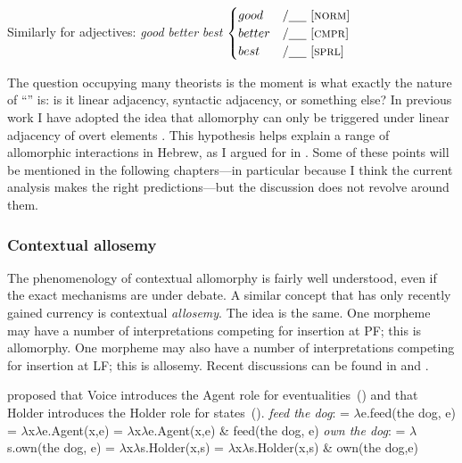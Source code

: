 Similarly for adjectives:
\pex
	\a \emph{good}		
	\a \emph{better}
	\a \emph{best}
\xe
\ex {} \lra $\begin{cases}
	good & / \trace~ \text{[\gsc{NORM}]} \\
	better & / \trace ~ \text{[\gsc{CMPR}]} \\
	best & / \trace ~ \text{[\gsc{SPRL}]} \\
	\end{cases}$
\xe

The question occupying many theorists is the moment is what exactly the nature of ``\trace'' is: is it linear adjacency, syntactic adjacency, or something else? In previous work I have adopted the idea that allomorphy can only be triggered under linear adjacency of overt elements \citep{embick10,marantz13}. This hypothesis helps explain a range of allomorphic interactions in Hebrew, as I argued for in \cite{kastner18nllt}. Some of these points will be mentioned in the following chapters---in particular because I think the current analysis makes the right predictions---but the discussion does not revolve around them.

		\subsubsection{Contextual allosemy}
The phenomenology of contextual allomorphy is fairly well understood, even if the exact mechanisms are under debate. A similar concept that has only recently gained currency is contextual \emph{allosemy}. The idea is the same. One morpheme may have a number of interpretations competing for insertion at PF; this is allomorphy. One morpheme may also have a number of interpretations competing for insertion at LF; this is allosemy. Recent discussions can be found in \cite{woodmarantz17} and \cite{mylermarantz19cup}.

\cite{kratzer96} proposed that Voice introduces the Agent role for eventualities~(\nextx) and that Holder introduces the Holder role for states~(\anextx).
\pex \emph{feed the dog}:
	\a {} = $\lambda$e.feed(the dog, e)
	\a {} = $\lambda$x$\lambda$e.Agent(x,e)
	\a {} = $\lambda$x$\lambda$e.Agent(x,e) \& feed(the dog, e)
\xe
\pex \emph{own the dog}:
	\a {} = $\lambda$s.own(the dog, e)
	\a {} = $\lambda$x$\lambda$s.Holder(x,s)
	\a {} = $\lambda$x$\lambda$s.Holder(x,s) \& own(the dog,e)
\xe

